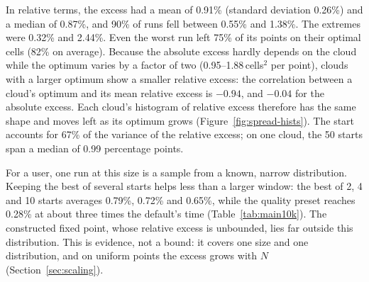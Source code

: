 In relative terms, the excess had a mean of 0.91\% (standard deviation 0.26\%) and a median
of 0.87\%, and 90\% of runs fell between 0.55\% and 1.38\%. The extremes were 0.32\% and
2.44\%. Even the worst run left 75\% of its points on their optimal cells (82\% on average).
Because the absolute excess hardly depends on the cloud while the optimum varies by a factor
of two (0.95--1.88\,cells$^2$ per point), clouds with a larger optimum show a smaller
relative excess: the correlation between a cloud's optimum and its mean relative excess is
$-0.94$, and $-0.04$ for the absolute excess. Each cloud's histogram of relative excess
therefore has the same shape and moves left as its optimum grows
(Figure~\ref{fig:spread-hists}). The start accounts for 67\% of the variance of the relative
excess; on one cloud, the 50 starts span a median of 0.99 percentage points.

For a user, one run at this size is a sample from a known, narrow distribution. Keeping the
best of several starts helps less than a larger window: the best of 2, 4 and 10 starts
averages 0.79\%, 0.72\% and 0.65\%, while the quality preset reaches 0.28\% at about three
times the default's time (Table~\ref{tab:main10k}). The constructed fixed point, whose relative excess is unbounded, lies
far outside this distribution. This is evidence, not a bound: it covers one size and one
distribution, and on uniform points the excess grows with $N$ (Section~\ref{sec:scaling}).
